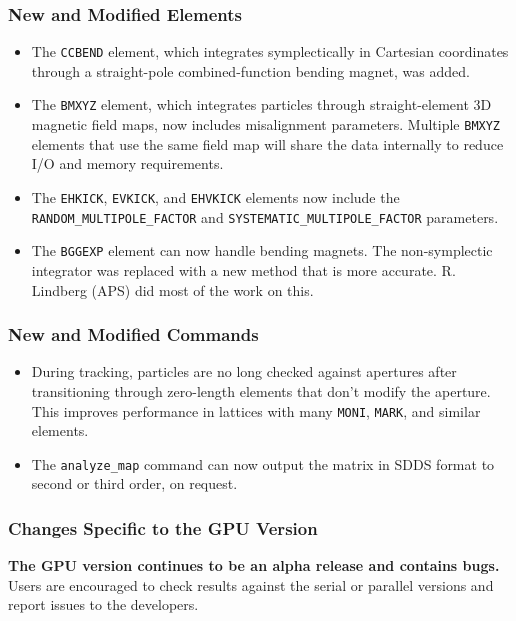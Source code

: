 \documentclass[11pt]{article}
\begin{document}
\subsubsection{New and Modified Elements}
\begin{itemize}
\item The \verb|CCBEND| element, which integrates symplectically in Cartesian coordinates
  through a straight-pole combined-function bending magnet, was added.
\item The \verb|BMXYZ| element, which integrates particles through straight-element 
  3D magnetic field maps, now includes misalignment parameters.
  Multiple \verb|BMXYZ| elements that use the same field map will share the data internally to reduce I/O and memory requirements.
\item The \verb|EHKICK|, \verb|EVKICK|, and \verb|EHVKICK| elements now include the \verb|RANDOM_MULTIPOLE_FACTOR| and 
  \verb|SYSTEMATIC_MULTIPOLE_FACTOR| parameters.
\item The \verb|BGGEXP| element can now handle bending magnets. The non-symplectic integrator was replaced with 
  a new method that is more accurate. R. Lindberg (APS) did most of the work on this.
\end{itemize}

\subsubsection{New and Modified Commands}
\begin{itemize}
\item During tracking, particles are no long checked against apertures after transitioning through zero-length elements that
  don't modify the aperture. This improves performance in lattices with many \verb|MONI|, \verb|MARK|, and similar elements.
\item The \verb|analyze_map| command can now output the matrix in SDDS format to second or third order, on request.
\end{itemize}

\subsubsection{Changes Specific to the GPU Version}

{\bf The GPU version continues to be an alpha release and contains bugs.}
Users are encouraged to check results against the serial or parallel versions and report issues to the developers.
\end{document}
